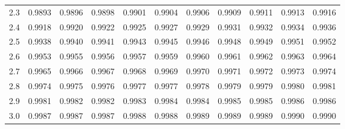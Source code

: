 \begin{tabular}{lllllllllll}
2.3 & 0.9893 & 0.9896 & 0.9898 & 0.9901 & 0.9904 & 0.9906 & 0.9909 & 0.9911 & 0.9913 & 0.9916 \\
2.4 & \cellcolor{gray!20}0.9918 & \cellcolor{gray!20}0.9920 & \cellcolor{gray!20}0.9922 & \cellcolor{gray!20}0.9925 & \cellcolor{gray!20}0.9927 & \cellcolor{gray!20}0.9929 & \cellcolor{gray!20}0.9931 & \cellcolor{gray!20}0.9932 & \cellcolor{gray!20}0.9934 & \cellcolor{gray!20}0.9936 \\
2.5 & 0.9938 & 0.9940 & 0.9941 & 0.9943 & 0.9945 & 0.9946 & 0.9948 & 0.9949 & 0.9951 & 0.9952 \\
2.6 & \cellcolor{gray!20}0.9953 & \cellcolor{gray!20}0.9955 & \cellcolor{gray!20}0.9956 & \cellcolor{gray!20}0.9957 & \cellcolor{gray!20}0.9959 & \cellcolor{gray!20}0.9960 & \cellcolor{gray!20}0.9961 & \cellcolor{gray!20}0.9962 & \cellcolor{gray!20}0.9963 & \cellcolor{gray!20}0.9964 \\
2.7 & 0.9965 & 0.9966 & 0.9967 & 0.9968 & 0.9969 & 0.9970 & 0.9971 & 0.9972 & 0.9973 & 0.9974 \\
2.8 & \cellcolor{gray!20}0.9974 & \cellcolor{gray!20}0.9975 & \cellcolor{gray!20}0.9976 & \cellcolor{gray!20}0.9977 & \cellcolor{gray!20}0.9977 & \cellcolor{gray!20}0.9978 & \cellcolor{gray!20}0.9979 & \cellcolor{gray!20}0.9979 & \cellcolor{gray!20}0.9980 & \cellcolor{gray!20}0.9981 \\
2.9 & 0.9981 & 0.9982 & 0.9982 & 0.9983 & 0.9984 & 0.9984 & 0.9985 & 0.9985 & 0.9986 & 0.9986 \\
3.0 & \cellcolor{gray!20}0.9987 & \cellcolor{gray!20}0.9987 & \cellcolor{gray!20}0.9987 & \cellcolor{gray!20}0.9988 & \cellcolor{gray!20}0.9988 & \cellcolor{gray!20}0.9989 & \cellcolor{gray!20}0.9989 & \cellcolor{gray!20}0.9989 & \cellcolor{gray!20}0.9990 & \cellcolor{gray!20}0.9990 \\
\bottomrule
\end{tabular}
